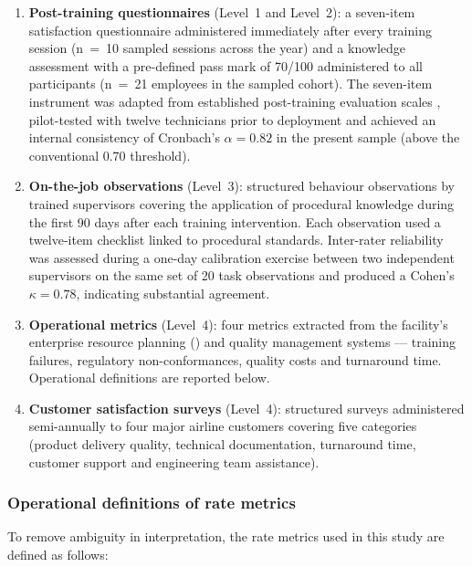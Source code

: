 \begin{enumerate}[label=(\alph*)]
  \item \textbf{Post-training questionnaires} (Level~1 and Level~2): a
        seven-item satisfaction questionnaire administered immediately after
        every training session (n~=~10 sampled sessions across the year) and
        a knowledge assessment with a pre-defined pass mark of 70/100
        administered to all participants (n~=~21 employees in the sampled
        cohort). The seven-item instrument was adapted from established
        post-training evaluation scales \citep{Kirkpatrick2010,Patel2023},
        pilot-tested with twelve technicians prior to deployment and
        achieved an internal consistency of Cronbach's $\alpha = 0.82$ in
        the present sample (above the conventional 0.70 threshold).
  \item \textbf{On-the-job observations} (Level~3): structured behaviour
        observations by trained supervisors covering the application of
        procedural knowledge during the first 90 days after each training
        intervention. Each observation used a twelve-item checklist linked
        to procedural standards. Inter-rater reliability was assessed during
        a one-day calibration exercise between two independent supervisors
        on the same set of 20 task observations and produced a Cohen's
        $\kappa = 0.78$, indicating substantial agreement.
  \item \textbf{Operational metrics} (Level~4): four metrics extracted from
        the facility's enterprise resource planning (\ERP{}) and quality
        management systems --- training failures, regulatory
        non-conformances, quality costs and turnaround time. Operational
        definitions are reported below.
  \item \textbf{Customer satisfaction surveys} (Level~4): structured surveys
        administered semi-annually to four major airline customers covering
        five categories (product delivery quality, technical documentation,
        turnaround time, customer support and engineering team assistance).
\end{enumerate}

\subsubsection*{Operational definitions of rate metrics}
\label{subsubsec:rate-definitions}

To remove ambiguity in interpretation, the rate metrics used in this study
are defined as follows:

